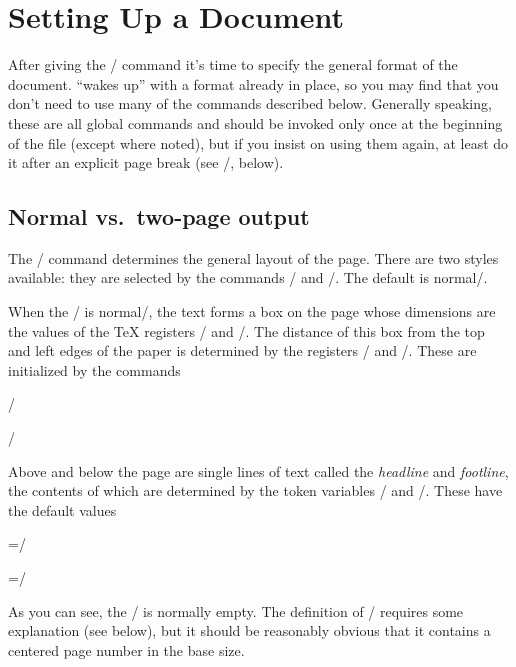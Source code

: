 {\bigsize\bfs\section{Setting Up a Document}}

After giving the \tts\typesize/ command it's time to specify the general format
of the document.  \jyTeX{} ``wakes up'' with a format already in place, so you
may find that you don't need to use many of the commands described below.
Generally speaking, these are all global commands and should be invoked only
once at the beginning of the file (except where noted), but if you insist on
using them again, at least do it after an explicit page break (see
\tts\newpage/, below).

{\sl\subsection{Normal vs.\ two-page output}}

The \tts\outputstyle/ command determines the general layout of the page. There
are two styles available: they are selected by the commands
\tts{}/ and \tts{}/.  The default is \tts
normal/.

When the \tts\outputstyle/ is \tts normal/, the text forms a box on the page
whose dimensions are the values of the \TeX{} registers \tts\vsize/ and
\tts\hsize/. The distance of this box from the top and left edges of the paper
is determined by the \jyTeX{} registers \tts\topmargin/ and \tts\leftmargin/.
These are initialized by the commands

\nobreak\smallskip

\tts\vsize=8.9in \hsize=6.5in/ \par
\tts\topmargin=1in \leftmargin=1in/ \par

\smallskip

\noindent Above and below the page are single lines of text called the {\it
headline} and {\it footline}, the contents of which are determined by the
token variables \tts\head/ and \tts\foot/. These have the default values

\nobreak\smallskip

\tts\head={\hfil}/ \par
\tts\foot={\hfil\normalfonts\numstyle\pagenum\hfil}/ \par

\smallskip

\noindent As you can see, the \tts\head/ is normally empty.  The definition of
\tts\foot/ requires some explanation (see below), but it should be reasonably
obvious that it contains a centered page number in the base size.

